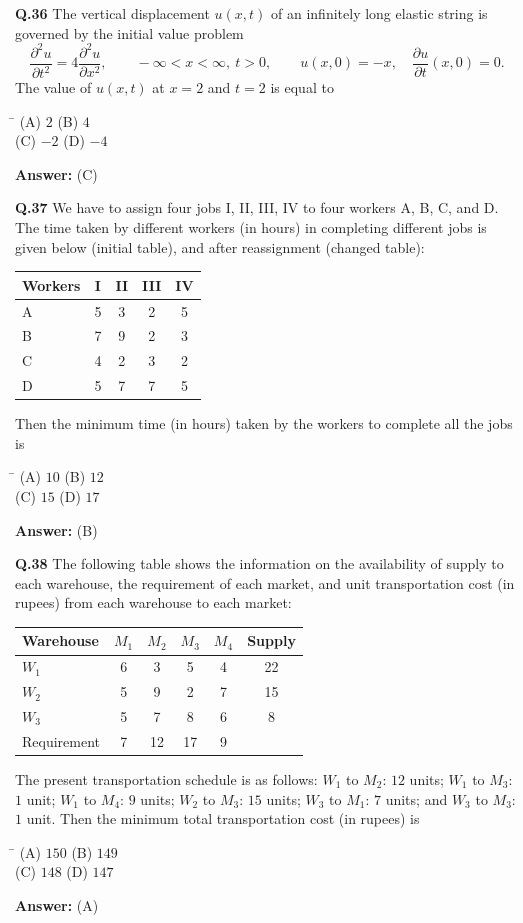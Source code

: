 \documentclass[11pt,a4paper]{article}
\newcommand{\optsfourA}[4]{%
  \begin{tabbing}
    \hspace{0.48\linewidth}\=\kill
    (A) #1 \> (B) #2 \\[2pt]
    (C) #3 \> (D) #4
  \end{tabbing}%
}
\newcommand{\ans}[1]{\textbf{Answer:} #1\par\medskip}
\begin{document}
\textbf{Q.36} The vertical displacement $u(x, t)$ of an infinitely long elastic string is governed by the initial value problem
\[
  \frac{\partial^2 u}{\partial t^2} = 4\frac{\partial^2 u}{\partial x^2}, \qquad -\infty < x < \infty,\ t > 0, \qquad u(x, 0) = -x, \quad \frac{\partial u}{\partial t}(x, 0) = 0.
\]
The value of $u(x, t)$ at $x = 2$ and $t = 2$ is equal to
\optsfourA{$2$}{$4$}{$-2$}{$-4$}
\ans{(C)}

\textbf{Q.37} We have to assign four jobs I, II, III, IV to four workers A, B, C, and D. The time taken by different workers (in hours) in completing different jobs is given below (initial table), and after reassignment (changed table):
\begin{center}
\begin{tabular}{lcccc}
  \toprule
  Workers & I & II & III & IV \\
  \midrule
  A & 5 & 3 & 2 & 5 \\
  B & 7 & 9 & 2 & 3 \\
  C & 4 & 2 & 3 & 2 \\
  D & 5 & 7 & 7 & 5 \\
  \bottomrule
\end{tabular}
\end{center}
Then the minimum time (in hours) taken by the workers to complete all the jobs is
\optsfourA{$10$}{$12$}{$15$}{$17$}
\ans{(B)}

\textbf{Q.38} The following table shows the information on the availability of supply to each warehouse, the requirement of each market, and unit transportation cost (in rupees) from each warehouse to each market:
\begin{center}
\begin{tabular}{lccccc}
  \toprule
  Warehouse & $M_1$ & $M_2$ & $M_3$ & $M_4$ & Supply \\
  \midrule
  $W_1$ & 6 & 3 & 5 & 4 & 22 \\
  $W_2$ & 5 & 9 & 2 & 7 & 15 \\
  $W_3$ & 5 & 7 & 8 & 6 & 8 \\
  \midrule
  Requirement & 7 & 12 & 17 & 9 & \\
  \bottomrule
\end{tabular}
\end{center}
The present transportation schedule is as follows: $W_1$ to $M_2$: $12$ units; $W_1$ to $M_3$: $1$ unit; $W_1$ to $M_4$: $9$ units; $W_2$ to $M_3$: $15$ units; $W_3$ to $M_1$: $7$ units; and $W_3$ to $M_3$: $1$ unit. Then the minimum total transportation cost (in rupees) is
\optsfourA{$150$}{$149$}{$148$}{$147$}
\ans{(A)}
\end{document}
